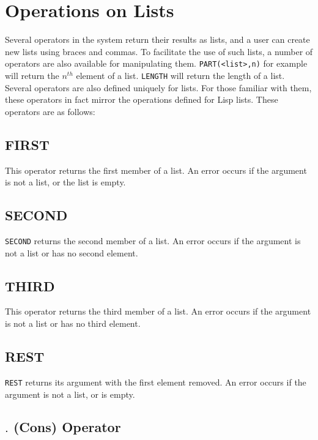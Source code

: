 \section{Operations on Lists}

Several operators in the system return their results as lists, and a user
can create new lists using braces and commas.  To facilitate the use of
such lists, a number of operators are also available for manipulating
them. {\tt PART(<list>,n)} for example will return the
$n^{th}$ element of a list. {\tt LENGTH} will return the
length of a list.  Several operators are also defined uniquely for lists.
For those familiar with them, these operators in fact mirror the
operations defined for Lisp lists.  These operators are as follows:

\subsection{FIRST}

This operator returns the first member of a list.  An error
occurs if the argument is not a list, or the list is empty.

\subsection{SECOND}

{\tt SECOND} returns the second member of a list.  An error
occurs if the argument is not a list or has no second element.

\subsection{THIRD}

This operator returns the third member of a list.  An error
occurs if the argument is not a list or has no third element.

\subsection{REST}

{\tt REST} returns its argument with the first element
removed.  An error occurs if the argument is not a list, or is empty.

\subsection{$.$ (Cons) Operator}

